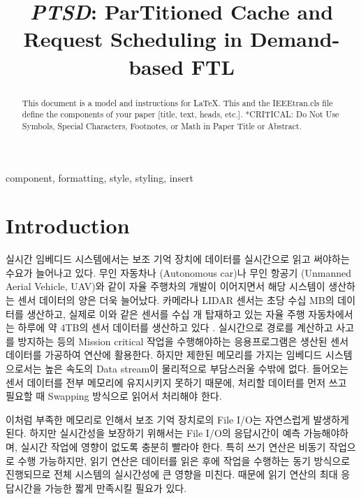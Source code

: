 \documentclass[conference]{IEEEtran}
\begin{document}
\title{\textit{PTSD}: \textbf{P}ar\textbf{T}itioned Cache and \\Request \textbf{S}cheduling in \textbf{D}emand-based FTL}

\author{
\and
{}
}

\maketitle

\begin{abstract}
This document is a model and instructions for \LaTeX.
This and the IEEEtran.cls file define the components of your paper [title, text, heads, etc.]. *CRITICAL: Do Not Use Symbols, Special Characters, Footnotes, 
or Math in Paper Title or Abstract.
\end{abstract}

\begin{IEEEkeywords}
component, formatting, style, styling, insert
\end{IEEEkeywords}

\section{Introduction}

실시간 임베디드 시스템에서는 보조 기억 장치에 데이터를 실시간으로 읽고 써야하는 수요가 늘어나고 있다.
무인 자동차나 (Autonomous car)나 무인 항공기 (Unmanned Aerial Vehicle, UAV)와 같이 자율 주행차의 개발이 이어지면서
해당 시스템이 생산하는 센서 데이터의 양은 더욱 늘어났다. 카메라나 LIDAR 센서는 초당 수십 MB의 데이터를 생산하고,
실제로 이와 같은 센서를 수십 개 탑재하고 있는 자율 주행 자동차에서는 하루에 약 4TB의 센서 데이터를 생산하고 있다 \cite{b9}.
실시간으로 경로를 계산하고 사고를 방지하는 등의 Mission critical 작업을 수행해야하는 응용프로그램은
생산된 센서 데이터를 가공하여 연산에 활용한다. 하지만 제한된 메모리를 가지는 임베디드 시스템으로서는 높은 속도의
Data stream이 물리적으로 부담스러울 수밖에 없다. 들어오는 센서 데이터를 전부 메모리에 유지시키지 못하기 때문에,
처리할 데이터를 먼저 쓰고 필요할 때 Swapping 방식으로 읽어서 처리해야 한다. \par

이처럼 부족한 메모리로 인해서 보조 기억 장치로의 File I/O는 자연스럽게 발생하게 된다. 하지만 실시간성을 보장하기 위해서는
File I/O의 응답시간이 예측 가능해야하며, 실시간 작업에 영향이 없도록 충분히 빨라야 한다. 특히 쓰기 연산은
비동기 작업으로 수행 가능하지만, 읽기 연산은 데이터를 읽은 후에 작업을 수행하는 동기 방식으로 진행되므로
전체 시스템의 실시간성에 큰 영향을 미친다. 때문에 읽기 연산의 최대 응답시간을 가능한 짧게 만족시킬 필요가 있다. \par
\end{document}
